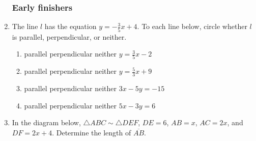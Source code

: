 \documentclass[12pt, twoside]{article}
\begin{document}
\begin{enumerate}
\subsubsection*{Early finishers}
\item The line $l$ has the equation $y=-\frac{3}{5}x+4$. To each line below, circle whether $l$ is parallel, perpendicular, or neither.
\begin{enumerate}
  \item parallel \quad perpendicular \quad neither \qquad $y=\frac{3}{5}x-2$
  \vspace{0.5cm}
  \item parallel \quad perpendicular \quad neither \qquad $y=\frac{5}{3}x+9$
  \vspace{0.5cm}
  \item parallel \quad perpendicular \quad neither \qquad $3x-5y=-15$
  \vspace{2cm}
  \item parallel \quad perpendicular \quad neither \qquad $5x-3y=6$
  \vspace{1.5cm}
\end{enumerate}

\item In the diagram below, $\triangle ABC \sim \triangle DEF$, $DE=6$, $AB=x$, $AC=2x$, and $DF=2x+4$. Determine the length of $\overline{AB}$.
  \begin{flushright}
  \end{flushright}

\end{enumerate}
\end{document}
